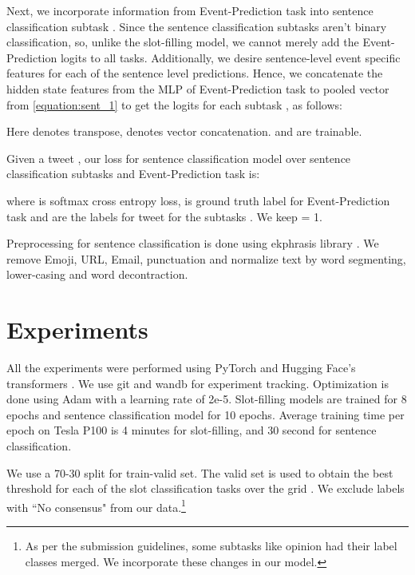 \documentclass[11pt,a4paper]{article}
\begin{document}
Next, we incorporate information from Event-Prediction task into sentence classification subtask . Since the sentence classification subtasks aren't binary classification, so, unlike the slot-filling model, we cannot merely add the Event-Prediction logits to all tasks. Additionally, we desire sentence-level event specific features for each of the sentence level predictions. Hence, we concatenate the hidden state features from the MLP of Event-Prediction task  to pooled vector  from \ref{equation:sent_1} to get the logits  for each subtask , as follows:



Here  denotes transpose,  denotes vector concatenation.  and  are trainable.

Given a tweet , our loss for sentence classification model over  sentence classification subtasks  and Event-Prediction task is:




where  is softmax cross entropy loss,   is ground truth label for Event-Prediction task and  are the labels for tweet  for the subtasks . We keep  = 1.

Preprocessing for sentence classification is done using ekphrasis library \cite{baziotis-pelekis-doulkeridis:2017:SemEval2}. We remove Emoji, URL, Email, punctuation and normalize text by word segmenting, lower-casing and word decontraction.


\section{Experiments}\label{experiments_section}

All the experiments were performed using PyTorch \cite{pytorch} and Hugging Face's transformers \cite{huggingface}. We use git and wandb \cite{wandb} for experiment tracking. Optimization is done using Adam \cite{kingma2014adam} with a learning rate of 2e-5. Slot-filling models are trained for 8 epochs and sentence classification model for 10 epochs. Average training time per epoch on Tesla P100 is  4 minutes for slot-filling, and  30 second for sentence classification.

We use a 70-30 split for train-valid set. The valid set is used to obtain the best threshold for each of the slot classification tasks over the grid . We exclude labels with ``No consensus" from our data.\footnote{As per the submission guidelines, some subtasks like opinion had their label classes merged. We incorporate these changes in our model.}
\end{document}
